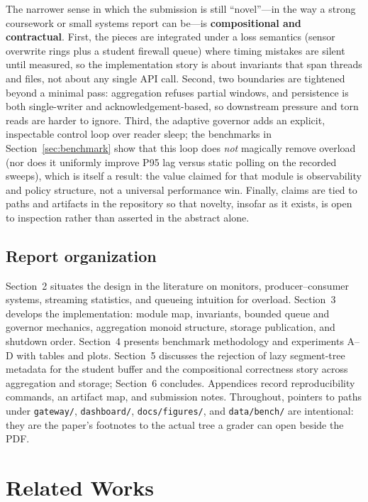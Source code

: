 \documentclass[11pt]{article}
\begin{document}
The narrower sense in which the submission is still ``novel''---in the way a strong coursework or small systems report can be---is \textbf{compositional and contractual}. First, the pieces are integrated under a loss semantics (sensor overwrite rings plus a student firewall queue) where timing mistakes are silent until measured, so the implementation story is about invariants that span threads and files, not about any single API call. Second, two boundaries are tightened beyond a minimal pass: aggregation refuses partial windows, and persistence is both single-writer and acknowledgement-based, so downstream pressure and torn reads are harder to ignore. Third, the adaptive governor adds an explicit, inspectable control loop over reader sleep; the benchmarks in Section~\ref{sec:benchmark} show that this loop does \emph{not} magically remove overload (nor does it uniformly improve P95 lag versus static polling on the recorded sweeps), which is itself a result: the value claimed for that module is observability and policy structure, not a universal performance win. Finally, claims are tied to paths and artifacts in the repository so that novelty, insofar as it exists, is open to inspection rather than asserted in the abstract alone.

\subsection*{Report organization}
Section~2 situates the design in the literature on monitors, producer--consumer systems, streaming statistics, and queueing intuition for overload. Section~3 develops the implementation: module map, invariants, bounded queue and governor mechanics, aggregation monoid structure, storage publication, and shutdown order. Section~4 presents benchmark methodology and experiments A--D with tables and plots. Section~5 discusses the rejection of lazy segment-tree metadata for the student buffer and the compositional correctness story across aggregation and storage; Section~6 concludes. Appendices record reproducibility commands, an artifact map, and submission notes. Throughout, pointers to paths under \texttt{gateway/}, \texttt{dashboard/}, \texttt{docs/figures/}, and \texttt{data/bench/} are intentional: they are the paper's footnotes to the actual tree a grader can open beside the PDF.

\section{Related Works} 
\end{document}
